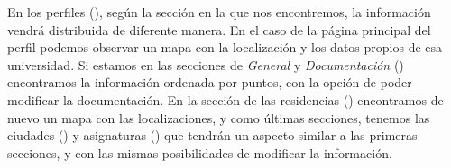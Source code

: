 En los perfiles (\textit{}), seg\'un la secci\'on en la que nos encontremos, la informaci\'on vendr\'a distribuida de diferente manera. En el caso de la p\'agina principal del perfil podemos observar un mapa con la localizaci\'on y los datos propios de esa universidad. Si estamos en las secciones de \textit{General} y \textit{Documentaci\'on} (\textit{}) encontramos la informaci\'on ordenada por puntos, con la opci\'on de poder modificar la documentaci\'on. En la secci\'on de las residencias (\textit{}) encontramos de nuevo un mapa con las localizaciones, y como \'ultimas secciones, tenemos las ciudades (\textit{}) y asignaturas (\textit{}) que tendr\'an un aspecto similar a las primeras secciones, y con las mismas posibilidades de modificar la informaci\'on.\\

